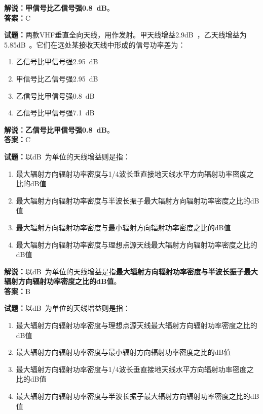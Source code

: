 \documentclass{ctexbook}
\begin{document}
\noindent\textbf{解说：甲信号比乙信号强\qty{0.8}{\dB}}。\\\noindent\textbf{答案：}C

\bigskip

\noindent\textbf{试题：}两款VHF垂直全向天线，用作发射。甲天线增益\num{2.9}\unit[qualifier-mode=combine]{\deci\bel{}}，乙天线增益为\num{5.85}\unit[qualifier-mode=combine]{\deci\bel{}}。它们在远处某接收天线中形成的信号功率差为：

\begin{enumerate}[leftmargin=3em]
  \item 乙信号比甲信号强\qty{2.95}{\dB}
  \item 甲信号比乙信号强\qty{2.95}{\dB}
  \item 乙信号比甲信号强\qty{0.8}{\dB}
  \item 乙信号比甲信号强\qty{7.1}{\dB}
\end{enumerate}

\noindent\textbf{解说：乙信号比甲信号强\qty{0.8}{\dB}}。\\\noindent\textbf{答案：}C

\bigskip

\noindent\textbf{试题：}以\unit[qualifier-mode=combine]{\deci\bel{}}为单位的天线增益则是指：

\begin{enumerate}[leftmargin=3em]
  \item 最大辐射方向辐射功率密度与1/4波长垂直接地天线水平方向辐射功率密度之比的\si{\dB}值
  \item 最大辐射方向辐射功率密度与半波长振子最大辐射方向辐射功率密度之比的\si{\dB}值
  \item 最大辐射方向辐射功率密度与最小辐射方向辐射功率密度之比的\si{\dB}值
  \item 最大辐射方向辐射功率密度与理想点源天线最大辐射方向辐射功率密度之比的\si{\dB}值
\end{enumerate}

\noindent\textbf{解说：}以\unit[qualifier-mode=combine]{\deci\bel{}}为单位的天线增益是指\textbf{最大辐射方向辐射功率密度与半波长振子最大辐射方向辐射功率密度之比的\si{\dB}值}。\\\noindent\textbf{答案：}B

\bigskip

\noindent\textbf{试题：}以\unit[qualifier-mode=combine]{\deci\bel{}}为单位的天线增益则是指：
\begin{enumerate}[leftmargin=3em]
  \item 最大辐射方向辐射功率密度与理想点源天线最大辐射方向辐射功率密度之比的\si{\dB}值
  \item 最大辐射方向辐射功率密度与最小辐射方向辐射功率密度之比的\si{\dB}值
  \item 最大辐射方向辐射功率密度与1/4波长垂直接地天线水平方向辐射功率密度之比的\si{\dB}值
  \item 最大辐射方向辐射功率密度与半波长振子最大辐射方向辐射功率密度之比的\si{\dB}值
\end{enumerate}
\end{document}
